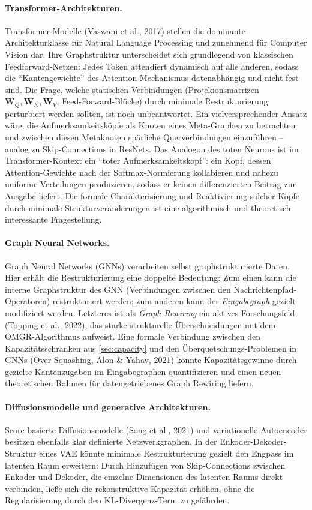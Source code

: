 \documentclass[12pt, a4paper, openany]{report}
\begin{document}
\paragraph{Transformer-Architekturen.}
Transformer-Modelle (Vaswani et al., 2017) stellen die dominante
Architekturklasse für Natural Language Processing und zunehmend für
Computer Vision dar.  Ihre Graphstruktur unterscheidet sich grundlegend
von klassischen Feedforward-Netzen: Jedes Token attendiert dynamisch
auf alle anderen, sodass die ``Kantengewichte'' des Attention-Mechanismus
datenabhängig und nicht fest sind.  Die Frage, welche statischen
Verbindungen (Projekionsmatrizen $\bm{W}_Q, \bm{W}_K, \bm{W}_V$,
Feed-Forward-Blöcke) durch minimale Restrukturierung perturbiert werden
sollten, ist noch unbeantwortet.  Ein vielversprechender Ansatz wäre,
die Aufmerksamkeitsköpfe als Knoten eines Meta-Graphen zu betrachten und
zwischen diesen Metaknoten spärliche Querverbindungen einzuführen --
analog zu Skip-Connections in ResNets.  Das Analogon des toten Neurons
ist im Transformer-Kontext ein ``toter Aufmerksamkeitskopf'': ein Kopf,
dessen Attention-Gewichte nach der Softmax-Normierung kollabieren und
nahezu uniforme Verteilungen produzieren, sodass er keinen
differenzierten Beitrag zur Ausgabe liefert.  Die formale
Charakterisierung und Reaktivierung solcher Köpfe durch minimale
Strukturveränderungen ist eine algorithmisch und theoretisch
interessante Fragestellung.

\paragraph{Graph Neural Networks.}
Graph Neural Networks (GNNs) verarbeiten selbst graphstrukturierte Daten.
Hier erhält die Restrukturierung eine doppelte Bedeutung: Zum einen kann
die interne Graphstruktur des GNN (Verbindungen zwischen den
Nachrichtenpfad-Operatoren) restrukturiert werden; zum anderen kann der
\emph{Eingabegraph} gezielt modifiziert werden.  Letzteres ist als
\emph{Graph Rewiring} ein aktives Forschungsfeld (Topping et al., 2022),
das starke strukturelle Überschneidungen mit dem OMGR-Algorithmus
aufweist.  Eine formale Verbindung zwischen den Kapazitätsschranken aus
\cref{sec:capacity} und den Überquetschungs-Problemen in GNNs (Over-Squashing,
Alon \& Yahav, 2021) könnte Kapazitätsgewinne durch gezielte Kantenzugaben
im Eingabegraphen quantifizieren und einen neuen theoretischen Rahmen für
datengetriebenes Graph Rewiring liefern.

\paragraph{Diffusionsmodelle und generative Architekturen.}
Score-basierte Diffusionsmodelle (Song et al., 2021) und variationelle
Autoencoder besitzen ebenfalls klar definierte Netzwerkgraphen.  In der
Enkoder-Dekoder-Struktur eines VAE könnte minimale Restrukturierung
gezielt den Engpass im latenten Raum erweitern: Durch Hinzufügen von
Skip-Connections zwischen Enkoder und Dekoder, die einzelne
Dimensionen des latenten Raums direkt verbinden, ließe sich die
rekonstruktive Kapazität erhöhen, ohne die Regularisierung durch den
KL-Divergenz-Term zu gefährden.
\end{document}
